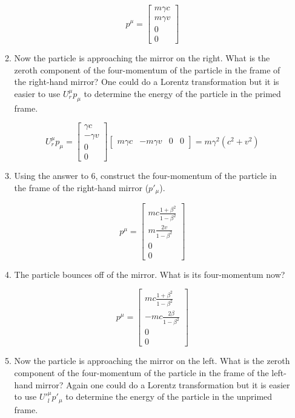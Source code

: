 \documentclass[pdftex,10pt]{article}
\begin{document}
\begin{enumerate}
\begin{enumerate}
$$
p^\mu = \left [ \begin{array}{c} m\gamma c \\ m\gamma v \\ 0 \\ 0 \end{array}
  \right ]
$$

\item Now the particle is approaching the mirror on the
  right.  What is the zeroth component of the four-momentum of the
  particle in the frame of the right-hand mirror?   One could do a
  Lorentz transformation but it is easier to use $U^\mu_r p_\mu$ to
  determine the energy of the particle in the primed frame.

$$
U^\mu_r p_\mu =
 \left [ \begin{array}{c} \gamma c \\ -\gamma v \\ 0 \\ 0 \end{array}
  \right ]
\left [ \begin{array}{cccc} m\gamma c & -m\gamma v & 0 & 0 \end{array}
  \right ] = m \gamma^2 \left ( c^2 + v^2 \right )
$$

\item Using the answer to 6, construct the four-momentum of
  the particle in the frame of the right-hand mirror ($p'_\mu$).

$$
p^\mu = \left [ \begin{array}{c} m c \frac{1+\beta^2}{1-\beta^2} \\ m
    \frac{2v}{1-\beta^2} \\ 0 \\ 0 \end{array}
  \right ]
$$

\item The particle bounces off of the mirror.  What is its
  four-momentum now?

$$
p^\mu = \left [ \begin{array}{c} m c \frac{1+\beta^2}{1-\beta^2} \\ -mc
    \frac{2\beta}{1-\beta^2} \\ 0 \\ 0 \end{array}
  \right ]
$$

\item Now the particle is approaching the mirror on the
  left.  What is the zeroth component of the four-momentum of the
  particle in the frame of the left-hand mirror?   Again one could 
  do a Lorentz transformation but it is easier to use $U'^\mu_l p'_\mu$ to
  determine the energy of the particle in the unprimed frame.


\end{enumerate}
\end{enumerate}
\end{document}
